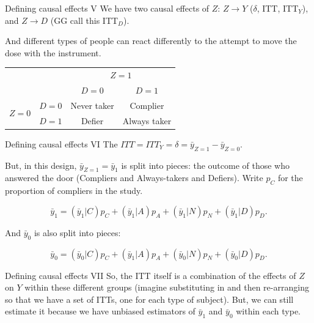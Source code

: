 \documentclass[
  ignorenonframetext,
]{beamer}
\begin{document}
\begin{frame}{Defining causal effects V}
\protect\hypertarget{defining-causal-effects-v}{}
We have two causal effects of \(Z\): \(Z \rightarrow Y\) (\(\delta\),
ITT, ITT\(_Y\)), and \(Z \rightarrow D\) (GG call this ITT\(_D\)).

And different types of people can react differently to the attempt to
move the dose with the instrument.

\centering
\begin{tabular}{llcc}
                       &        & \multicolumn{2}{c}{$Z=1$} \\
               &       & $D=0$ & $D=1$ \\
               \midrule
\multirow{2}{*}{$Z=0$} & $D=0$ & Never taker & Complier \\
                       & $D=1$ & Defier     & Always taker \\
               \bottomrule
\end{tabular}
\end{frame}

\begin{frame}{Defining causal effects VI}
\protect\hypertarget{defining-causal-effects-vi}{}
The \(ITT=ITT_Y=\delta= \bar{y}_{Z=1} - \bar{y}_{Z=0}\).

\medskip

But, in this design, \(\bar{y}_{Z=1}=\bar{y}_{1}\) is split into pieces:
the outcome of those who answered the door (Compliers and Always-takers
and Defiers). Write \(p_C\) for the proportion of compliers in the
study.

\begin{equation}
\bar{y}_{1}=(\bar{y}_{1}|C)p_C + (\bar{y}_{1}|A)p_A + (\bar{y}_1|N)p_N + (\bar{y}_1|D)p_D.
\end{equation}

And \(\bar{y}_{0}\) is also split into pieces:

\begin{equation}
\bar{y}_{0}=(\bar{y}_{0}|C)p_C + (\bar{y}_{1}|A)p_A + (\bar{y}_{0}|N)p_N + (\bar{y}_0|D)p_D.
\end{equation}
\end{frame}

\begin{frame}{Defining causal effects VII}
\protect\hypertarget{defining-causal-effects-vii}{}
So, the ITT itself is a combination of the effects of \(Z\) on \(Y\)
within these different groups (imagine substituting in and then
re-arranging so that we have a set of ITTs, one for each type of
subject). But, we can still estimate it because we have unbiased
estimators of \(\bar{y}_1\) and \(\bar{y}_0\) within each type.
\end{frame}
\end{document}
